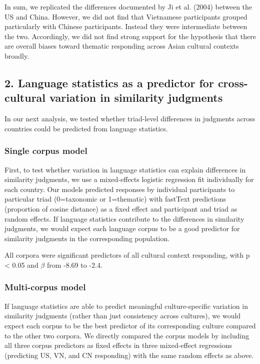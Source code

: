 \documentclass[10pt, letterpaper]{article}
\begin{document}
In sum, we replicated the differences documented by Ji et al. (2004)
between the US and China. However, we did not find that Vietnamese
participants grouped particularly with Chinese participants. Instead
they were intermediate between the two. Accordingly, we did not find
strong support for the hypothesis that there are overall biases toward
thematic responding across Asian cultural contexts broadly.

\hypertarget{language-statistics-as-a-predictor-for-cross-cultural-variation-in-similarity-judgments}{%
\subsection{2. Language statistics as a predictor for cross-cultural
variation in similarity
judgments}\label{language-statistics-as-a-predictor-for-cross-cultural-variation-in-similarity-judgments}}

In our next analysis, we tested whether triad-level differences in
judgments across countries could be predicted from language statistics.

\hypertarget{single-corpus-model}{%
\subsubsection{Single corpus model}\label{single-corpus-model}}

First, to test whether variation in language statistics can explain
differences in similarity judgments, we use a mixed-effects logistic
regression fit individually for each country. Our models predicted
responses by individual participants to particular triad (0=taxonomic or
1=thematic) with fastText predictions (proportion of cosine distance) as
a fixed effect and participant and triad as random effects. If language
statistics contribute to the differences in similarity judgments, we
would expect each language corpus to be a good predictor for similarity
judgments in the corresponding population.

All corpora were significant predictors of all cultural context
responding, with p \textless{} 0.05 and \(\beta\) from -8.69 to -2.4.

\hypertarget{multi-corpus-model}{%
\subsubsection{Multi-corpus model}\label{multi-corpus-model}}

If language statistics are able to predict meaningful culture-specific
variation in similarity judgments (rather than just consistency across
cultures), we would expect each corpus to be the best predictor of its
corresponding culture compared to the other two corpora. We directly
compared the corpus models by including all three corpus predictors as
fixed effects in three mixed-effect regressions (predicting US, VN, and
CN responding) with the same random effects as above.
\end{document}
